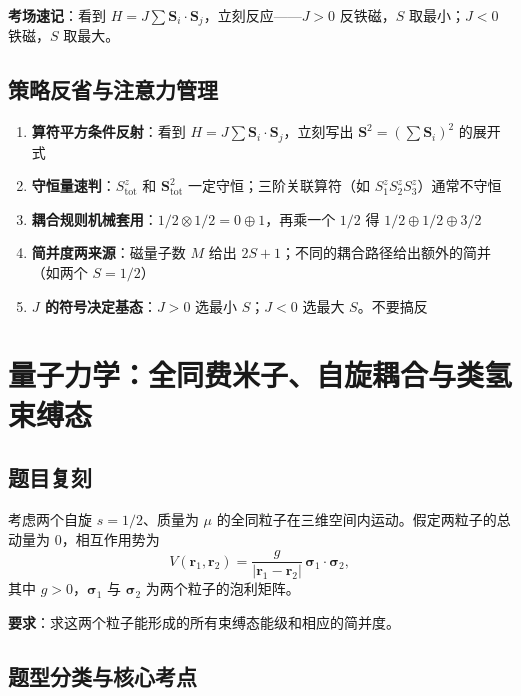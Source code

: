 \textbf{考场速记}：看到 $H = J\sum \bm{S}_i \cdot \bm{S}_j$，立刻反应——$J>0$ 反铁磁，$S$ 取最小；$J<0$ 铁磁，$S$ 取最大。

\subsection{策略反省与注意力管理}

\begin{enumerate}[nosep]
    \item \textbf{算符平方条件反射}：看到 $H = J\sum \bm{S}_i \cdot \bm{S}_j$，立刻写出 $\bm{S}^2 = (\sum \bm{S}_i)^2$ 的展开式
    \item \textbf{守恒量速判}：$S_{\text{tot}}^z$ 和 $\bm{S}_{\text{tot}}^2$ 一定守恒；三阶关联算符（如 $S_1^z S_2^z S_3^z$）通常不守恒
    \item \textbf{耦合规则机械套用}：$1/2 \otimes 1/2 = 0 \oplus 1$，再乘一个 $1/2$ 得 $1/2 \oplus 1/2 \oplus 3/2$
    \item \textbf{简并度两来源}：磁量子数 $M$ 给出 $2S+1$；不同的耦合路径给出额外的简并（如两个 $S=1/2$）
    \item \textbf{$J$ 的符号决定基态}：$J>0$ 选最小 $S$；$J<0$ 选最大 $S$。不要搞反
\end{enumerate}


\newpage
\section[量子力学：全同费米子、自旋耦合与类氢束缚态]{量子力学：全同费米子、自旋耦合与类氢束缚态}
\label{sec:identical-fermions}

\subsection{题目复刻}

\begin{modelbox}[两个全同费米子的类氢束缚态]
考虑两个自旋 $s=1/2$、质量为 $\mu$ 的全同粒子在三维空间内运动。假定两粒子的总动量为 $0$，相互作用势为
\[
V(\bm{r}_1, \bm{r}_2) = \frac{g}{|\bm{r}_1 - \bm{r}_2|} \, \bm{\sigma}_1 \cdot \bm{\sigma}_2,
\]
其中 $g > 0$，$\bm{\sigma}_1$ 与 $\bm{\sigma}_2$ 为两个粒子的泡利矩阵。

\textbf{要求}：求这两个粒子能形成的所有束缚态能级和相应的简并度。
\end{modelbox}

\subsection{题型分类与核心考点}

